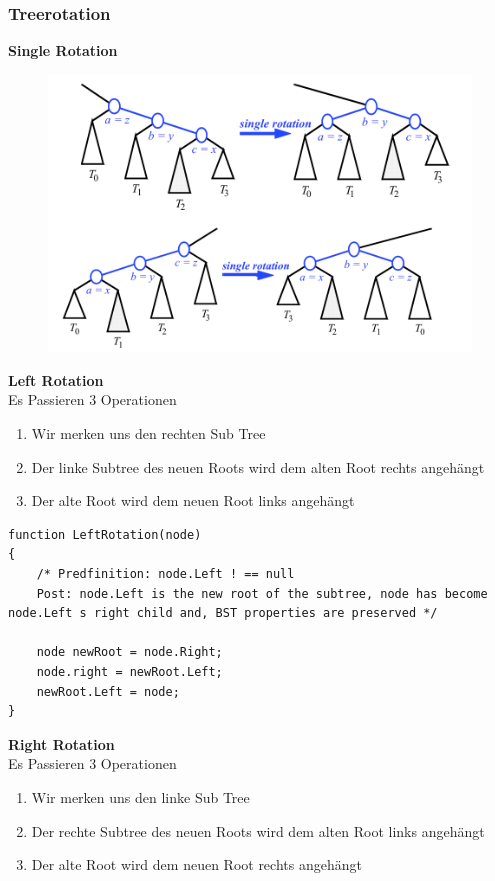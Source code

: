 \documentclass[a4paper,10pt]{report}
\begin{document}
\subsubsection{Treerotation}
\textbf{Single Rotation}\\
\begin{figure}[H]
	\begin{center}
  		\includegraphics[width=\textwidth]{img/singlerotation.png}
	\end{center}
\end{figure}
\noindent
\textbf{Left Rotation}\\
Es Passieren 3 Operationen
\begin{enumerate}
	\item 
		Wir merken uns den rechten Sub Tree
	\item
		Der linke Subtree des neuen Roots wird dem alten Root rechts angehängt		
	\item
		Der alte Root wird dem neuen Root links angehängt
\end{enumerate}
\begin{lstlisting}
function LeftRotation(node)
{
	/* Predfinition: node.Left ! == null
	Post: node.Left is the new root of the subtree, node has become node.Left s right child and, BST properties are preserved */

	node newRoot = node.Right;
	node.right = newRoot.Left;
	newRoot.Left = node;
}
\end{lstlisting}
\textbf{Right Rotation}\\
Es Passieren 3 Operationen
\begin{enumerate}
	\item 
		Wir merken uns den linke Sub Tree
	\item
		Der rechte Subtree des neuen Roots wird dem alten Root links angehängt		
	\item
		Der alte Root wird dem neuen Root rechts angehängt
\end{enumerate}
\end{document}
